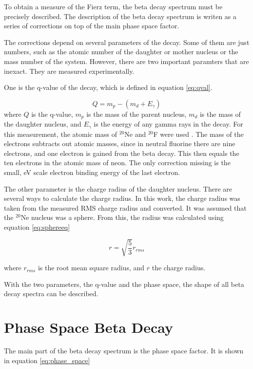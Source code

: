To obtain a measure of the Fierz term, the beta decay spectrum must be precisely described.
The description of the beta decay spectrum is writen as a series of corrections on top of the main phase space factor.  

The corrections depend on several parameters of the decay. 
Some of them are just numbers, such as the atomic number of the daughter or mother nucleus or the mass number of the system.
However, there are two important paramters that are inexact.
They are measured experimentally.

One is the q-value of the decay, which is defined in equation \ref{eq:qval}.

\begin{equation}
	Q = m_{p} - (m_{d} + E_{\gamma})
	\label{eq:qval}
\end{equation} 
where $Q$ is the q-value, $m_{p}$ is the mass of the parent nucleus, $m_{d}$ is the mass of the daughter nucleus, and $E_{\gamma}$ is the energy of any gamma rays in the decay.
For this measurement, the atomic mass of $^{20}$Ne and $^{20}$F were used \cite{Pfe12}.
The mass of the electrons subtracts out atomic masses, since in neutral fluorine there are nine electrons, and one electron is gained from the beta decay.
This then equals the ten electrons in the atomic mass of neon.
The only correction missing is the small, eV scale electron binding energy of the last electron.

The other parameter is the charge radius of the daughter nucleus.
There are several ways to calculate the charge radius.
In this work, the charge radius was taken from the measured RMS charge radius and converted.
It was assumed that the $^{20}$Ne nucleus was a sphere. 
From this, the radius was calculated using equation \ref{eq:sphereeq}

\begin{equation}
	r = \sqrt{\frac{5}{3}}r_{rms}	
	\label{eq:sphereeq}
\end{equation}

where $r_{rms}$ is the root mean square radius, and $r$ the charge radius.

With the two parameters, the q-value and the phase space, the shape of all beta decay spectra can be described.

\section{Phase Space Beta Decay}
The main part of the beta decay spectrum is the phase space factor.
It is shown in equation \ref{eq:phase_space}

